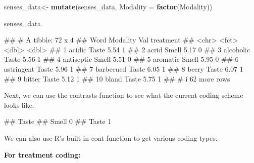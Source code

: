 \documentclass[
]{book}
\newenvironment{Shaded}{\begin{snugshade}}{\end{snugshade}}
\newcommand{\AttributeTok}[1]{\textcolor[rgb]{0.13,0.29,0.53}{#1}}
\newcommand{\FunctionTok}[1]{\textcolor[rgb]{0.13,0.29,0.53}{\textbf{#1}}}
\newcommand{\NormalTok}[1]{#1}
\newcommand{\OtherTok}[1]{\textcolor[rgb]{0.56,0.35,0.01}{#1}}
\newcommand{\SpecialCharTok}[1]{\textcolor[rgb]{0.81,0.36,0.00}{\textbf{#1}}}
\begin{document}
\begin{Shaded}
\begin{Highlighting}[]
\NormalTok{senses\_data}\OtherTok{\textless{}{-}} \FunctionTok{mutate}\NormalTok{(senses\_data, }\AttributeTok{Modality =} \FunctionTok{factor}\NormalTok{(Modality))}

\NormalTok{senses\_data}
\end{Highlighting}
\end{Shaded}

\begin{Shaded}
\begin{Highlighting}[]
\NormalTok{\#\# \# A tibble: 72 x 4}
\NormalTok{\#\#    Word       Modality   Val treatment}
\NormalTok{\#\#    \textless{}chr\textgreater{}      \textless{}fct\textgreater{}    \textless{}dbl\textgreater{}     \textless{}dbl\textgreater{}}
\NormalTok{\#\#  1 acidic     Taste     5.54         1}
\NormalTok{\#\#  2 acrid      Smell     5.17         0}
\NormalTok{\#\#  3 alcoholic  Taste     5.56         1}
\NormalTok{\#\#  4 antiseptic Smell     5.51         0}
\NormalTok{\#\#  5 aromatic   Smell     5.95         0}
\NormalTok{\#\#  6 astringent Taste     5.96         1}
\NormalTok{\#\#  7 barbecued  Taste     6.05         1}
\NormalTok{\#\#  8 beery      Taste     6.07         1}
\NormalTok{\#\#  9 bitter     Taste     5.12         1}
\NormalTok{\#\# 10 bland      Taste     5.75         1}
\NormalTok{\#\# \# i 62 more rows}
\end{Highlighting}
\end{Shaded}

Next, we can use the contrasts function to see what the current coding scheme looks like.

\begin{Shaded}
\end{Shaded}

\begin{Shaded}
\begin{Highlighting}[]
\NormalTok{\#\#       Taste}
\NormalTok{\#\# Smell     0}
\NormalTok{\#\# Taste     1}
\end{Highlighting}
\end{Shaded}

We can also use R's built in cont function to get various coding types.

\textbf{For treatment coding:}
\end{document}
